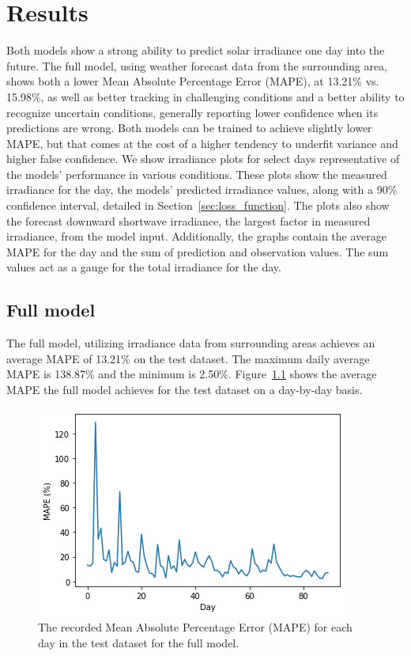 \chapter{Results}
Both models show a strong ability to predict solar irradiance one day into the future.
The full model, using weather forecast data from the surrounding area, shows both a lower Mean Absolute Percentage Error (MAPE), at 13.21\% vs. 15.98\%, as well as better tracking in challenging conditions and a better ability to recognize uncertain conditions, generally reporting lower confidence when its predictions are wrong. Both models can be trained to achieve slightly lower MAPE, but that comes at the cost of a higher tendency to underfit variance and higher false confidence.
We show irradiance plots for select days representative of the models' performance in various conditions. These plots show the measured irradiance for the day, the models' predicted irradiance values, along with a 90\% confidence interval, detailed in Section~\ref{sec:loss_function}. The plots also show the forecast downward shortwave irradiance, the largest factor in measured irradiance, from the model input. Additionally, the graphs contain the average MAPE for the day and the sum of prediction and observation values. The sum values act as a gauge for the total irradiance for the day.




\section{Full model}
The full model, utilizing irradiance data from surrounding areas achieves an average MAPE of 13.21\% on the test dataset. The maximum daily average MAPE is 138.87\% and the minimum is 2.50\%. Figure~\ref{fig:days_full} shows the average MAPE the full model achieves for the test dataset on a day-by-day basis.
\begin{figure}[ht!]
    \centering
    \includegraphics[scale=0.8]{imgs/graphs/full/days_full.png}
    \caption{The recorded Mean Absolute Percentage Error (MAPE) for each day in the test dataset for the full model. 
    \label{fig:days_full}}
\end{figure}




